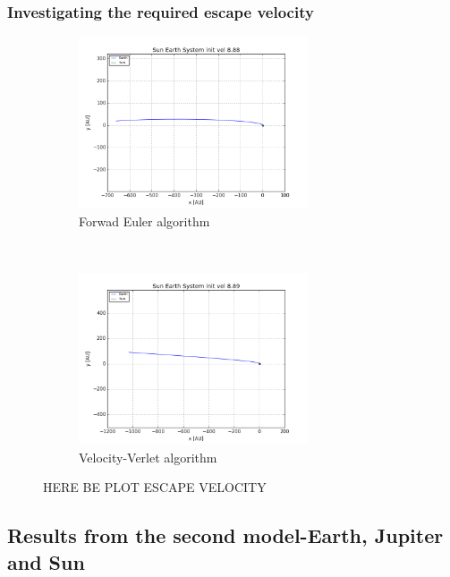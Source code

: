 \documentclass[a4paper, 10pt]{article}
\begin{document}
\subsubsection{Investigating the required escape velocity}
\begin{figure}[t!]
    \centering
    \begin{subfigure}[t]{0.5\textwidth}
        \centering
        \includegraphics[height=2.0in]{escape888.png}
        \caption{Forwad Euler algorithm}
    \end{subfigure}%
    ~ 
    \begin{subfigure}[t]{0.5\textwidth}
        \centering
        \includegraphics[height=2.0in]{escape889.png}
        \caption{Velocity-Verlet algorithm}
    \end{subfigure}
    \caption{HERE BE PLOT ESCAPE VELOCITY}
\end{figure}

\subsection{Results from the second model-Earth, Jupiter and Sun}
\end{document}

